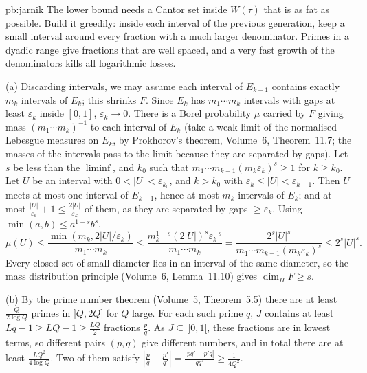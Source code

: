 \begin{solution}{pb:jarnik}
\idea The lower bound needs a Cantor set inside $W(\tau)$ that is as fat as possible. Build it greedily: inside each interval of the previous generation, keep a small
interval around every fraction with a much larger denominator. Primes in a dyadic range give fractions that are well spaced, and a very fast growth of the
denominators kills all logarithmic losses.

\writeup (a) Discarding intervals, we may assume each interval of $E_{k-1}$ contains exactly $m_k$ intervals of $E_k$; this shrinks $F$. Since $E_k$ has
$m_1\cdots m_k$ intervals with gaps at least $\varepsilon_k$ inside $[0,1]$, $\varepsilon_k\to0$. There is a Borel probability $\mu$ carried by $F$ giving mass
$(m_1\cdots m_k)^{-1}$ to each interval of $E_k$ (take a weak limit of the normalised Lebesgue measures on $E_k$, by Prokhorov's theorem, Volume~6, Theorem~11.7;
the masses of the intervals pass to the limit because they are separated by gaps). Let $s$ be less than the $\liminf$, and $k_0$ such that
$m_1\cdots m_{k-1}(m_k\varepsilon_k)^s\ge1$ for $k\ge k_0$. Let $U$ be an interval with $0<|U|<\varepsilon_{k_0}$, and $k>k_0$ with $\varepsilon_k\le|U|<\varepsilon_{k-1}$.
Then $U$ meets at most one interval of $E_{k-1}$, hence at most $m_k$ intervals of $E_k$; and at most $\frac{|U|}{\varepsilon_k}+1\le\frac{2|U|}{\varepsilon_k}$
of them, as they are separated by gaps $\ge\varepsilon_k$. Using $\min(a,b)\le a^{1-s}b^s$,
\[
\mu(U)\le\frac{\min(m_k,2|U|/\varepsilon_k)}{m_1\cdots m_k}\le\frac{m_k^{1-s}(2|U|)^s\varepsilon_k^{-s}}{m_1\cdots m_k}=\frac{2^s|U|^s}{m_1\cdots m_{k-1}(m_k\varepsilon_k)^s}\le2^s|U|^s.
\]
Every closed set of small diameter lies in an interval of the same diameter, so the mass distribution principle (Volume~6, Lemma~11.10) gives $\dim_HF\ge s$.

(b) By the prime number theorem (Volume~5, Theorem~5.5) there are at least $\frac Q{2\log Q}$ primes in $]Q,2Q]$ for $Q$ large. For each such prime $q$, $J$ contains at least
$Lq-1\ge LQ-1\ge\frac{LQ}2$ fractions $\frac pq$. As $J\subseteq\,]0,1[$, these fractions are in lowest terms, so different pairs $(p,q)$ give different numbers, and in
total there are at least $\frac{LQ^2}{4\log Q}$. Two of them satisfy $|\frac pq-\frac{p'}{q'}|=\frac{|pq'-p'q|}{qq'}\ge\frac1{4Q^2}$.


\end{solution}
